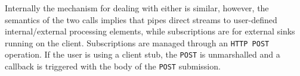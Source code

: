 Internally the mechanism for dealing with either is similar, however, the semantics of the two calls implies that
pipes direct streams to user-defined internal/external processing elements, while subscriptions are
for external sinks running on the client.  Subscriptions are managed through an \texttt{HTTP POST}
operation.  If the user is using a client stub, the \texttt{POST} is unmarshalled and a callback
is triggered with the body of the \texttt{POST} submission.





